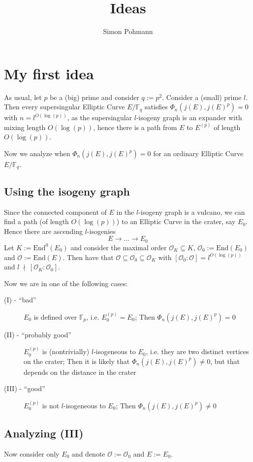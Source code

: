 \documentclass{scrartcl}
\title{Ideas}
\author{Simon Pohmann}
\newcommand{\F}{\mathbb{F}}
\newcommand{\End}{\mathrm{End}}
\newcommand{\notdivides}{\ \nmid \ }
\renewcommand{\O}{\mathcal{O}}
\theoremstyle{definition}
\begin{document}
\maketitle
\tableofcontents

\section{My first idea}
As usual, let $p$ be a (big) prime and consider $q := p^2$.
Consider a (small) prime $l$.
Then every supersingular Elliptic Curve $E/\F_q$ satisfies $\Phi_n(j(E), j(E)^p) = 0$ with $n = l^{O(\log(p))}$, as the supersingular $l$-isogeny graph is an expander with mixing length $O(\log(p))$, hence there is a path from $E$ to $E^{(p)}$ of length $O(\log(p))$.

Now we analyze when $\Phi_n(j(E), j(E)^p) = 0$ for an ordinary Elliptic Curve $E/\F_q$.

\subsection*{Using the isogeny graph}
Since the connected component of $E$ in the $l$-isogeny graph is a vulcano, we can find a path (of length $O(\log(p))$) to an Elliptic Curve in the crater, say $E_0$.
Hence there are ascending $l$-isogenies
\begin{equation*}
    E \to ... \to E_0
\end{equation*}
Let $K := \End^0(E_0)$ and consider the maximal order $\O_K \subseteq K$, $\O_0 := \End(E_0)$ and $\O := \End(E)$.
Then have that $\O \subseteq \O_0 \subseteq \O_K$ with $[\O_0 : \O] = l^{O(\log(p))}$ and $l \notdivides [\O_K : \O_0]$.

Now we are in one of the following cases:
\begin{description}
    \item[(I) - ``bad''] $E_0$ is defined over $\F_p$, i.e. $E_0^{(p)} = E_0$; Then $\Phi_n(j(E), j(E)^p) = 0$
    \item[(II) - ``probably good''] $E_0^{(p)}$ is (nontrivially) $l$-isogeneous to $E_0$, i.e. they are two distinct vertices on the crater; Then it is likely that $\Phi_n(j(E), j(E)^p) \neq 0$, but that depends on the distance in the crater
    \item[(III) - ``good''] $E_0^{(p)}$ is not $l$-isogeneous to $E_0$; Then $\Phi_n(j(E), j(E)^p) \neq 0$ 
\end{description}

\subsection{Analyzing (III)}
Now consider only $E_0$ and denote $\O := \O_0$ and $E := E_0$.
\end{document}
